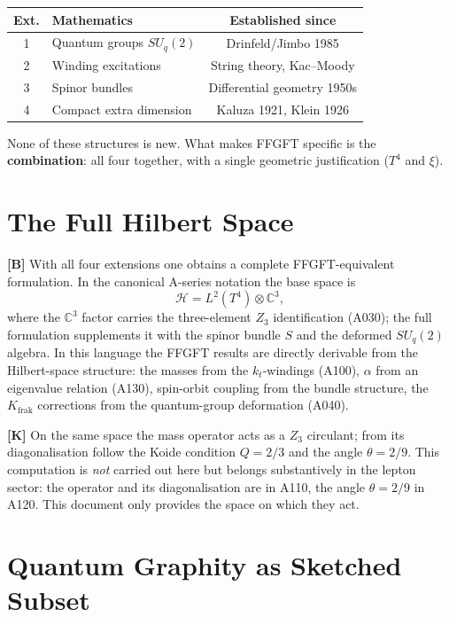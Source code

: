 \begin{center}
\renewcommand{\arraystretch}{1.4}
{\small
\begin{tabular}{clc}
\toprule
\textbf{Ext.} & \textbf{Mathematics} & \textbf{Established since} \\
\midrule
1 & Quantum groups $SU_q(2)$ & Drinfeld/Jimbo 1985 \\
2 & Winding excitations & String theory, Kac--Moody \\
3 & Spinor bundles & Differential geometry 1950s \\
4 & Compact extra dimension & Kaluza 1921, Klein 1926 \\
\bottomrule
\end{tabular}
}
\renewcommand{\arraystretch}{1.0}
\end{center}

None of these structures is new. What makes FFGFT specific is the
\textbf{combination}: all four together, with a single geometric justification
($T^4$ and $\xi$).

\section{The Full Hilbert Space}

\textbf{[B]} With all four extensions one obtains a complete FFGFT-equivalent
formulation. In the canonical A-series notation the base space is
\[
  \mathcal{H} = L^2(T^4)\otimes\mathbb{C}^3,
\]
where the $\mathbb{C}^3$ factor carries the three-element $Z_3$ identification
(A030); the full formulation supplements it with the spinor bundle $S$ and the
deformed $SU_q(2)$ algebra. In this language the FFGFT results are directly
derivable from the Hilbert-space structure: the masses from the $k_t$-windings
(A100), $\alpha$ from an eigenvalue relation (A130), spin-orbit coupling from the
bundle structure, the $K_{\text{frak}}$ corrections from the quantum-group
deformation (A040).

\textbf{[K]} On the same space the mass operator acts as a $Z_3$ circulant; from
its diagonalisation follow the Koide condition $Q=2/3$ and the angle $\theta=2/9$.
This computation is \emph{not} carried out here but belongs substantively in the
lepton sector: the operator and its diagonalisation are in A110, the angle
$\theta=2/9$ in A120. This document only provides the space on which they act.

\section{Quantum Graphity as Sketched Subset}

